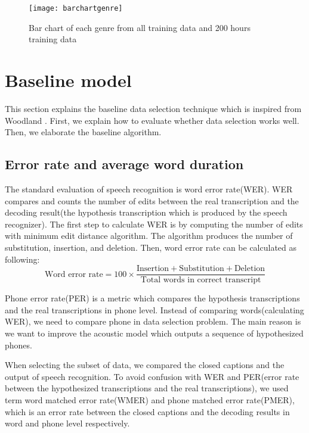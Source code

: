 \begin{figure}
\caption{Bar chart of each genre from all training data and 200 hours training data}
\texttt{[image: barchartgenre]}
\centering
\end{figure}




\section{Baseline model}
This section explains the baseline data selection technique which is inspired from Woodland \cite{Woodland2015}. First, we explain how to evaluate whether data selection works well. Then, we elaborate the baseline algorithm. 



\subsection{Error rate and average word duration}
The standard evaluation of speech recognition is word error rate(WER). WER compares and counts the number of edits between the real transcription and the decoding result(the hypothesis transcription which is produced by the speech recognizer). The first step to calculate WER is by computing the number of edits with minimum edit distance algorithm. The algorithm produces the number of substitution, insertion, and deletion.  Then, word error rate can be calculated as following:
\begin{equation}
\textrm{Word error rate} = 100 \times \frac{\textrm{Insertion} + \textrm{Substitution} + \textrm{Deletion}}{\textrm{Total words in correct transcript}}
\end{equation}

Phone error rate(PER) is a metric which compares the hypothesis transcriptions and the real transcriptions in phone level. Instead of comparing words(calculating WER), we need to compare phone in data selection problem. The main reason is we want to improve the acoustic model which outputs a sequence of hypothesized phones. 

When selecting the subset of data, we compared the closed captions and the output of speech recognition. To avoid confusion with WER and PER(error rate between the hypothesized transcriptions and the real transcriptions), we used term word matched error rate(WMER) and phone matched error rate(PMER), which is an error rate between the closed captions and the decoding results in word and phone level respectively.

